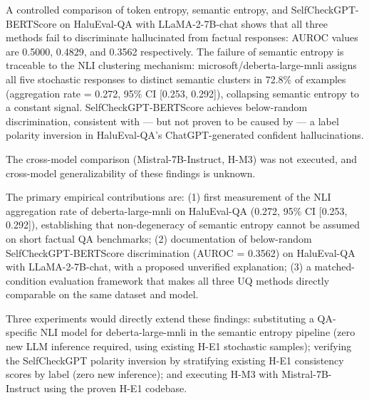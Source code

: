 
A controlled comparison of token entropy, semantic entropy, and SelfCheckGPT-BERTScore on HaluEval-QA with LLaMA-2-7B-chat shows that all three methods fail to discriminate hallucinated from factual responses: AUROC values are 0.5000, 0.4829, and 0.3562 respectively. The failure of semantic entropy is traceable to the NLI clustering mechanism: microsoft/deberta-large-mnli assigns all five stochastic responses to distinct semantic clusters in 72.8\% of examples (aggregation rate = 0.272, 95\% CI [0.253, 0.292]), collapsing semantic entropy to a constant signal. SelfCheckGPT-BERTScore achieves below-random discrimination, consistent with — but not proven to be caused by — a label polarity inversion in HaluEval-QA's ChatGPT-generated confident hallucinations.

The cross-model comparison (Mistral-7B-Instruct, H-M3) was not executed, and cross-model generalizability of these findings is unknown.

The primary empirical contributions are: (1) first measurement of the NLI aggregation rate of deberta-large-mnli on HaluEval-QA (0.272, 95\% CI [0.253, 0.292]), establishing that non-degeneracy of semantic entropy cannot be assumed on short factual QA benchmarks; (2) documentation of below-random SelfCheckGPT-BERTScore discrimination (AUROC = 0.3562) on HaluEval-QA with LLaMA-2-7B-chat, with a proposed unverified explanation; (3) a matched-condition evaluation framework that makes all three UQ methods directly comparable on the same dataset and model.

Three experiments would directly extend these findings: substituting a QA-specific NLI model for deberta-large-mnli in the semantic entropy pipeline (zero new LLM inference required, using existing H-E1 stochastic samples); verifying the SelfCheckGPT polarity inversion by stratifying existing H-E1 consistency scores by label (zero new inference); and executing H-M3 with Mistral-7B-Instruct using the proven H-E1 codebase.

